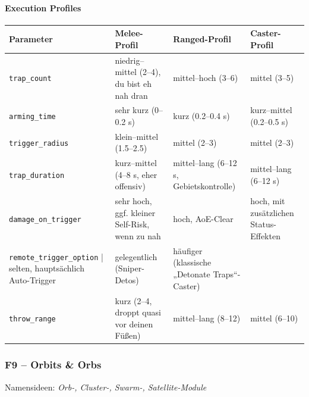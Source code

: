 \paragraph{Execution Profiles}{}
\scriptsize %
\begin{tabular}{p{3cm} | p{4cm} | p{4cm} | p{4cm}}
	Parameter            & Melee-Profil                                            & Ranged-Profil                                              & Caster-Profil                                                    \\
	\hline
	\texttt{trap\_count}         & niedrig–mittel (2–4), du bist eh nah dran              & mittel–hoch (3–6)                                          & mittel (3–5)                                                     \\
	\texttt{arming\_time}        & sehr kurz (0–0.2 s)                                    & kurz (0.2–0.4 s)                                           & kurz–mittel (0.2–0.5 s)                                         \\
	\texttt{trigger\_radius}     & klein–mittel (1.5–2.5)                                 & mittel (2–3)                                               & mittel (2–3)                                                     \\
	\texttt{trap\_duration}      & kurz–mittel (4–8 s, eher offensiv)                     & mittel–lang (6–12 s, Gebietskontrolle)                    & mittel–lang (6–12 s)                                             \\
	\texttt{damage\_on\_trigger}  & sehr hoch, ggf. kleiner Self-Risk, wenn zu nah         & hoch, AoE-Clear                                            & hoch, mit zusätzlichen Status-Effekten                          \\
	\texttt{remote\_trigger\_option} | selten, hauptsächlich Auto-Trigger                  & gelegentlich (Sniper-Detos)                                & häufiger (klassische „Detonate Traps“-Caster)                   \\
	\texttt{throw\_range}        & kurz (2–4, droppt quasi vor deinen Füßen)              & mittel–lang (8–12)                                         & mittel (6–10)                                                    \\
	\hline
\end{tabular}
\normalsize
\subsubsection{F9 – Orbits \& Orbs}
Namensideen: \emph{Orb-, Cluster-, Swarm-, Satellite-Module}

